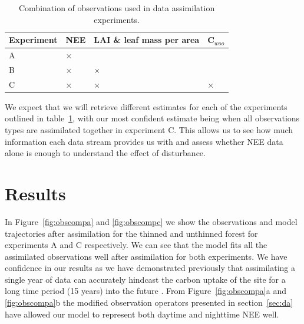 \documentclass[draft,linenumbers]{agujournal}
\begin{document}
\begin{table}[ht] 
	\caption{Combination of observations used in data assimilation experiments.}
\begin{center}
	\begin{tabular}{| l | l | l | l |}
	\hline
	Experiment & NEE & LAI \& leaf mass per area & C\(_{woo}\) \\ \hline
	A & \(\times\) &  &  \\ \hline
	B & \(\times\) & \(\times\) &  \\ \hline
	C & \(\times\) & \(\times\) & \(\times\)  \\ \hline
	\end{tabular}
	\label{table:obs_da}
\end{center} 
\end{table}

We expect that we will retrieve different estimates for each of the experiments outlined in table~\ref{table:obs_da}, with our most confident estimate being when all observations types are assimilated together in experiment C. This allows us to see how much information each data stream provides us with and assess whether NEE data alone is enough to understand the effect of disturbance.

\section{Results} \label{sec:results}

In Figure~\ref{fig:obscompa} and \ref{fig:obscompc} we show the observations and model trajectories after assimilation for the  thinned and unthinned forest for experiments A and C respectively. We can see that the model fits all the assimilated observations well after assimilation for both experiments. We have confidence in our results as we have demonstrated previously that assimilating a single year of data can accurately hindcast the carbon uptake of the site for a long time period (15 years) into the future \citep{Pinnington2016299}. From Figure~\ref{fig:obscompa}a and \ref{fig:obscompa}b the modified observation operators presented in section~\ref{sec:da} have allowed our model to represent both daytime and nighttime NEE well. 
\end{document}
